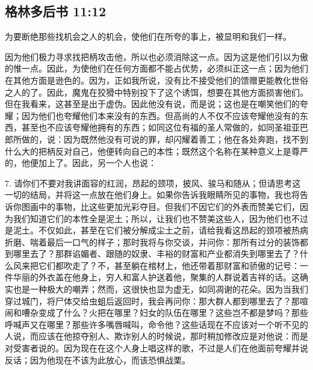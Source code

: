 
\subsection{格林多后书 11:12}

为要断绝那些找机会之人的机会，使他们在所夸的事上，被显明和我们一样。\par

因为他们极力寻求找把柄攻击他，所以也必须消除这一点。因为这是他们引以为傲的惟一点。因此，为使他们在任何方面都不能占优势，必须纠正这一点；因为他们在其他方面是逊色的。因为，正如我所说，没有比不接受他们的馈赠更能教化世俗之人的了。因此，魔鬼在狡猾中特别投下了这个诱饵，想要在其他方面损害他们。但在我看来，这甚至是出于虚伪。因此他没有说，而是说；这也是在嘲笑他们的夸耀；因为他们也夸耀他们本来没有的东西。但高尚的人不仅不应该夸耀他没有的东西，甚至也不应该夸耀他拥有的东西；如同这位有福的圣人常做的，如同圣祖亚巴郎所做的，说：因为既然他没有可说的罪，却闪耀着善工；他在各处奔跑，找不到什么大的把柄反对自己，他便转向自己的本性；既然这个名称在某种意义上是尊严的，他便加上了。因此，另一个人也说：\par

7. 请你们不要对我讲面容的红润，昂起的颈项，披风、骏马和随从；但请思考这一切的结局，并将这一点放在他们身上。如果你告诉我眼睛所见的事物，我也将告诉你图画中的事物，比这些更加光彩夺目。但我们不因它们的外表而赞美它们，因为我们知道它们的本性全是泥土；所以，让我们也不赞美这些人，因为他们也不过是泥土。不仅如此，甚至在它们被分解成尘土之前，请给我看这昂起的颈项被热病折磨、喘着最后一口气的样子；那时我将与你交谈，并问你：那所有过分的装饰都到哪里去了？那群谄媚者、跟随的奴隶、丰裕的财富和产业都消失到哪里去了？什么风来把它们都吹走了？不，甚至躺在棺材上，他还带着那财富和骄傲的记号：一件华丽的外衣盖在他身上，穷人和富人护送着他，聚集的人群说着吉祥的话。这确实也是一种极大的嘲弄；然而，这很快也显为虚无，如同凋谢的花朵。因为当我们穿过城门，将尸体交给虫蛆后返回时，我会再问你：那大群人都到哪里去了？那喧闹和嘈杂变成了什么？火把在哪里？妇女的队伍在哪里？这些岂不都是梦吗？那些呼喊声又在哪里？那些许多嘴唇喊叫，命令他？这些话现在不应该对一个听不见的人说，而应该在他掠夺别人、欺诈别人的时候说，那时稍加修改应是对他说：而是对受害者说的。因为现在在这个人身上唱这样的歌，不过是人们在他面前夸耀并说反话；因为他现在不该为此放心，而该恐惧战栗。\par

